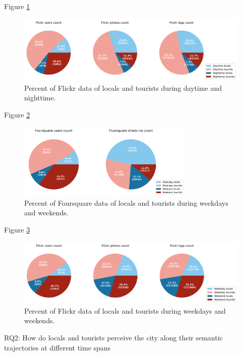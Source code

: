 \documentclass{article}
\begin{document}
Figure \ref{fig:flickr_day_count_pie}
\begin{figure}
\centering
\includegraphics[width=1.13\textwidth]{figures/flickr_day_count_pie.png}
\caption{\label{fig:flickr_day_count_pie}Percent of Flickr data of locals and tourists during daytime and nighttime.}
\end{figure}


Figure \ref{fig:foursquare_week_count_pie}
\begin{figure}
\centering
\includegraphics[width=0.75\textwidth]{figures/foursquare_week_count_pie.png}
\caption{\label{fig:foursquare_week_count_pie}Percent of Foursquare data of locals and tourists during weekdays and weekends.}
\end{figure}

Figure \ref{fig:flickr_week_count_pie}
\begin{figure}
\centering
\includegraphics[width=1.13\textwidth]{figures/flickr_week_count_pie.png}
\caption{\label{fig:flickr_week_count_pie}Percent of Flickr data of locals and tourists during weekdays and weekends.}
\end{figure}


RQ2: How do locals and tourists perceive the city along their semantic trajectories at different time spans
\end{document}
